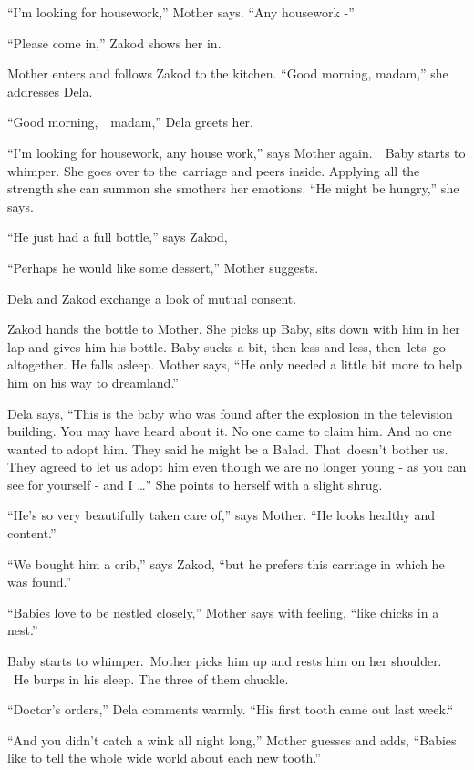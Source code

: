 \documentclass[twoside,11pt]{book}
\begin{document}
``I'm looking for housework,'' Mother says. ``Any housework -'' 

``Please come in,'' Zakod shows her in. 

Mother enters and follows Zakod to the kitchen. ``Good morning, madam,'' she addresses Dela.

``Good morning,\ \ madam,'' Dela greets her. 

``I'm looking for housework, any house work,'' says Mother again.\ \ Baby starts to whimper.
She goes over to the~carriage and peers inside. Applying all the strength she can summon she smothers her emotions.
``He might be hungry,'' she says.\ 

``He just had a full bottle,'' says Zakod,

``Perhaps he would like some dessert,'' Mother suggests.

Dela and Zakod exchange a look of mutual consent.

Zakod hands the bottle to Mother. She picks up Baby, sits down with him in her lap and gives him his bottle. Baby sucks
a bit, then less and less, then\ lets\ go altogether. He falls asleep. Mother says, ``He only needed a
little bit more to help him on his way to dreamland.'' 

Dela says, ``This is the baby who was found after the explosion in the television building. You may have
heard about it. No one came to claim him. And no one wanted to adopt him. They said he might be a Balad. That~doesn't
bother us. They agreed to let us adopt him even though we are no longer young - as you can see for yourself - and I
{\dots}'' She points to herself with a slight shrug.

``He's so very beautifully taken care of,'' says Mother. ``He looks healthy and
content.'' 

``We bought him a crib,'' says Zakod, ``but he prefers this carriage in which he
was found.''

``Babies love to be nestled closely,'' Mother says with feeling, ``like chicks in
a nest.'' 

Baby starts to whimper.\ Mother picks him up and rests him on her shoulder. ~He burps in his sleep. The three of them
chuckle. 

``Doctor's orders,'' Dela comments warmly. ``His first tooth came out last
week.``~ 

``And you didn't catch a wink all night long,'' Mother guesses and adds, ``Babies
like to tell the whole wide world about each new tooth.'' 
\end{document}
